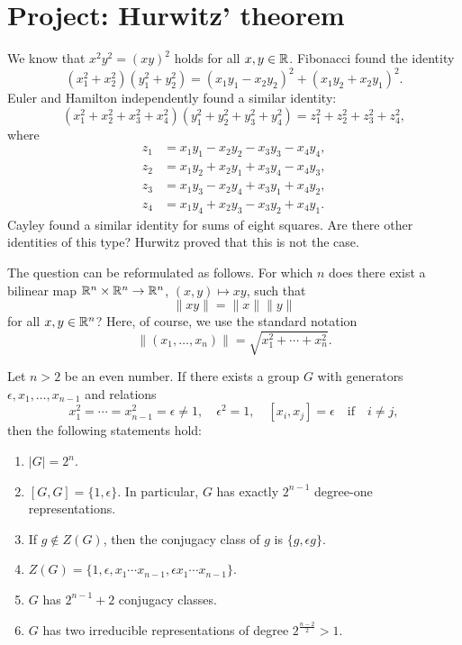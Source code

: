 \section{Project: Hurwitz' theorem}

We know that $x^2y^2=(xy)^2$ holds for all $x,y\in\mathbb{R}$. Fibonacci
found the identity
\begin{equation}
\label{eq:2squares}
	(x_1^2+x_2^2)(y_1^2+y_2^2)=(x_1y_1-x_2y_2)^2+(x_1y_2+x_2y_1)^2.
\end{equation}
Euler and Hamilton independently found 
a similar identity:
\[
	(x_1^2+x_2^2+x_3^2+x_4^2)(y_1^2+y_2^2+y_3^2+y_4^2)=z_1^2+z_2^2+z_3^2+z_4^2,
\]
where
\begin{equation}
\label{eq:Hamilton}
\begin{aligned}
	 z_1&=x_1y_1-x_2y_2-x_3y_3-x_4y_4,\\
	 z_2&=x_1y_2+x_2y_1+x_3y_4-x_4y_3,\\
	 z_3&=x_1y_3-x_2y_4+x_3y_1+x_4y_2,\\ 
	 z_4&=x_1y_4+x_2y_3-x_3y_2+x_4y_1.
\end{aligned}
\end{equation}
Cayley found a similar identity for sums of eight squares. 
Are there other identities of this type? Hurwitz
proved that this is not the case. 

The question can be reformulated as follows. For which $n$ does there 
exist a bilinear map $\mathbb{R}^n\times\mathbb{R}^n\to\mathbb{R}^n$, 
$(x,y)\mapsto xy$, such that
\[
\|xy\|=\|x\|\|y\|
\]
for all $x,y\in\mathbb{R}^n$? Here, of course, we use the 
standard notation
\[
\|(x_1,\dots,x_n)\|=\sqrt{x_1^2+\cdots+x_n^2}.
\]

 \begin{lemma}
 \label{lem:hurwitz_group}
 	Let $n>2$ be an even number. If 
 	there exists a group $G$ with generators
 	$\epsilon,x_1,\dots,x_{n-1}$ and relations 
 	\[
 		x_1^2=\cdots=x_{n-1}^2=\epsilon\ne1,\quad
 		\epsilon^2=1,\quad
 		[x_i,x_j]=\epsilon\quad\text{if}\quad i\ne j,
 	\]
 	then the following statements hold:
 	\begin{enumerate}
 		\item $|G|=2^n$.
 		\item $[G,G]=\{1,\epsilon\}$. In particular, $G$ 
 		    has exactly $2^{n-1}$ degree-one representations. 
 		\item If $g\not\in Z(G)$, then the conjugacy class of $g$ is $\{g,\epsilon g\}$.
 		\item $Z(G)=\{1,\epsilon,x_1\cdots x_{n-1},\epsilon x_1\cdots x_{n-1}\}$. 
 		\item $G$ has $2^{n-1}+2$ conjugacy classes.
 		\item $G$ has two irreducible representations of degree $2^{\frac{n-2}{2}}>1$. 
 	\end{enumerate}
 \end{lemma}

